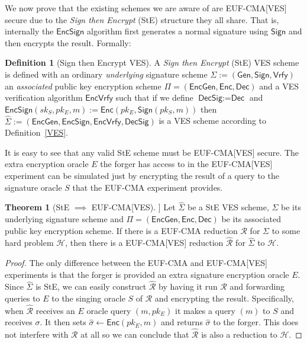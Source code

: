 \documentclass[fullpage]{article}
\theoremstyle{definition}
\newtheorem{definition}{Definition}[section]
\newtheorem{theorem}{Theorem}[section]
\newcommand{\EUFCMA}{\textsf{EUF-CMA}\xspace}
\newcommand{\EUFCMAVES}{\textsf{EUF-CMA}[\textsf{VES}]\xspace}
\newcommand{\Dec}{\textsf{Dec}}
\newcommand{\Enc}{\textsf{Enc}}
\newcommand{\EncGen}{\textsf{EncGen}}
\newcommand{\EncSign}{\textsf{EncSign}}
\newcommand{\EncVer}{\textsf{EncVrfy}}
\newcommand{\DecSig}{\textsf{DecSig}}
\newcommand{\KeyGen}{\textsf{Gen}}
\newcommand{\Sign}{\textsf{Sign}}
\newcommand{\Verify}{\textsf{Vrfy}}
\newcommand{\SIGNALG}{\KeyGen, \Sign, \Verify}
\newcommand{\ENCALG}{\EncGen, \Enc, \Dec}
\newcommand{\skSign}{sk_S}
\newcommand{\pkSign}{pk_S}
\newcommand{\pkEnc}{pk_E}
\newcommand{\hatsigma}{\hat{\sigma}}
\newcommand{\hatSigma}{\hat{\Sigma}}
\newcommand{\R}{\mathcal{R}}
\newcommand{\hatR}{\hat{\mathcal{R}}}
\newcommand{\hardproblem}{\mathcal{H}}
\begin{document}
We now prove that the existing schemes we are aware of\cite{Boneh:2003:AVE:1766171.1766207, Ruckert:2009:SVE:1615384.1615387, waters-ves, SHAO20081961, VES-structure-preserving} are \EUFCMAVES secure due to the \emph{Sign then Encrypt} (StE) structure they all share. That is, internally the $\EncSign$ algorithm first generates a normal signature using $\Sign$ and then encrypts the result. Formally:

\begin{definition}[Sign then Encrypt VES]
A \emph{Sign then Encrypt} (StE) VES scheme is defined with an ordinary \emph{underlying} signature scheme $\Sigma := (\SIGNALG)$ an \emph{associated} public key encryption scheme $\Pi = (\ENCALG)$ and a VES verification algorithm $\EncVer$ such that if we define $\DecSig := \Dec$ and $\EncSign(\skSign, \pkEnc, m) := \Enc(\pkEnc, \Sign(\pkSign, m))$ then $\hatSigma := (\EncGen, \EncSign, \EncVer, \DecSig)$ is a VES scheme according to Definition~\ref{VES}.
\end{definition}

It is easy to see that any valid StE scheme must be \EUFCMAVES secure. The extra encryption oracle $E$ the forger has access to in the \EUFCMAVES experiment can be simulated just by encrypting the result of a query to the signature oracle $S$ that the \EUFCMA experiment provides.

\begin{theorem}[StE $\implies$ \EUFCMAVES]
Let $\hatSigma$ be a StE VES scheme,  $\Sigma$ be its underlying signature scheme and $\Pi = (\ENCALG)$ be its associated public key encryption scheme.
If there is a \EUFCMA reduction $\R$ for $\Sigma$ to some hard problem $\hardproblem$, then there is a \EUFCMAVES reduction $\hatR$ for $\hatSigma$ to $\hardproblem$.
\end{theorem}

\begin{proof}
The only difference between the \EUFCMA and \EUFCMAVES experiments is that the forger is provided an extra signature encryption oracle $E$. Since $\hatSigma$ is StE, we can easily construct $\hatR$ by having it run $\R$ and forwarding queries to $E$ to the singing oracle $S$ of $\R$ and encrypting the result. Specifically, when $\hatR$ receives an $E$ oracle query $(m, \pkEnc)$ it makes a query $(m)$ to $S$ and receives $\sigma$. It then sets $\hatsigma \gets \Enc(\pkEnc, m)$ and returns $\hatsigma$ to the forger. This does not interfere with $\R$ at all so we can conclude that $\hatR$ is also a reduction to $\hardproblem$.
\end{proof}
\end{document}
